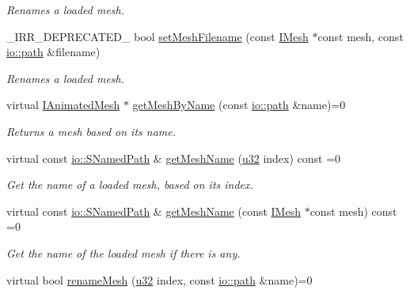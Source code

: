 \begin{DoxyCompactItemize}
\begin{DoxyCompactList}\small\item\em Renames a loaded mesh. \end{DoxyCompactList}\item 
\+\_\+\+I\+R\+R\+\_\+\+D\+E\+P\+R\+E\+C\+A\+T\+E\+D\+\_\+ bool \hyperlink{classirr_1_1scene_1_1IMeshCache_a9b7770a23859ddd045b3c22dfbecbcaf}{set\+Mesh\+Filename} (const \hyperlink{classirr_1_1scene_1_1IMesh}{I\+Mesh} $\ast$const mesh, const \hyperlink{namespaceirr_1_1io_ab1bdc45edb3f94d8319c02bc0f840ee1}{io\+::path} \&filename)
\begin{DoxyCompactList}\small\item\em Renames a loaded mesh. \end{DoxyCompactList}\item 
virtual \hyperlink{classirr_1_1scene_1_1IAnimatedMesh}{I\+Animated\+Mesh} $\ast$ \hyperlink{classirr_1_1scene_1_1IMeshCache_a4c93e736bdca8c84d478afc82540d6bb}{get\+Mesh\+By\+Name} (const \hyperlink{namespaceirr_1_1io_ab1bdc45edb3f94d8319c02bc0f840ee1}{io\+::path} \&name)=0
\begin{DoxyCompactList}\small\item\em Returns a mesh based on its name. \end{DoxyCompactList}\item 
virtual const \hyperlink{structirr_1_1io_1_1SNamedPath}{io\+::\+S\+Named\+Path} \& \hyperlink{classirr_1_1scene_1_1IMeshCache_af06efb8fb21f6bba16e52d879b5d3ddd}{get\+Mesh\+Name} (\hyperlink{namespaceirr_a0416a53257075833e7002efd0a18e804}{u32} index) const =0
\begin{DoxyCompactList}\small\item\em Get the name of a loaded mesh, based on its index. \end{DoxyCompactList}\item 
virtual const \hyperlink{structirr_1_1io_1_1SNamedPath}{io\+::\+S\+Named\+Path} \& \hyperlink{classirr_1_1scene_1_1IMeshCache_a7271fa1247b8c1198c196dc947b5ede0}{get\+Mesh\+Name} (const \hyperlink{classirr_1_1scene_1_1IMesh}{I\+Mesh} $\ast$const mesh) const =0
\begin{DoxyCompactList}\small\item\em Get the name of the loaded mesh if there is any. \end{DoxyCompactList}\item 
virtual bool \hyperlink{classirr_1_1scene_1_1IMeshCache_a820743b703cdc4362a3dbe6664271bcb}{rename\+Mesh} (\hyperlink{namespaceirr_a0416a53257075833e7002efd0a18e804}{u32} index, const \hyperlink{namespaceirr_1_1io_ab1bdc45edb3f94d8319c02bc0f840ee1}{io\+::path} \&name)=0

\end{DoxyCompactItemize}
